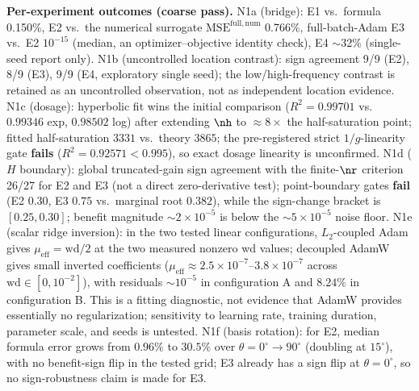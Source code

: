 \textbf{Per-experiment outcomes (coarse pass).}
N1a (bridge): E1 vs.\ formula 0.150\%, E2 vs.\ the numerical surrogate $\mathrm{MSE}^{\mathrm{full,num}}$ 0.766\%, full-batch-Adam E3 vs.\ E2 $10^{-15}$ (median, an optimizer--objective identity check), E4 $\sim$32\% (single-seed report only).
N1b (uncontrolled location contrast): sign agreement 9/9 (E2), 8/9 (E3), 9/9 (E4, exploratory single seed); the low/high-frequency contrast is retained as an uncontrolled observation, not as independent location evidence.
N1c (dosage): hyperbolic fit wins the initial comparison ($R^2=0.99701$ vs.\ $0.99346$ exp, $0.98502$ log) after extending $\nh$ to $\approx 8\times$ the half-saturation point; fitted half-saturation $3331$ vs.\ theory $3865$; the pre-registered strict $1/g$-linearity gate \textbf{fails} ($R^2=0.92571<0.995$), so exact dosage linearity is unconfirmed.
N1d ($H$ boundary): global truncated-gain sign agreement with the finite-$\nr$ criterion 26/27 for E2 and E3 (not a direct zero-derivative test); point-boundary gates \textbf{fail} (E2 $0.30$, E3 $0.75$ vs.\ marginal root $0.382$), while the sign-change bracket is $[0.25,0.30]$; benefit magnitude $\sim 2\times10^{-5}$ is below the $\sim 5\times10^{-5}$ noise floor.
N1e (scalar ridge inversion): in the two tested linear configurations, $L_2$-coupled Adam gives $\mu_{\mathrm{eff}}=\mathrm{wd}/2$ at the two measured nonzero wd values; decoupled AdamW gives small inverted coefficients ($\mu_{\mathrm{eff}}\approx2.5\times10^{-7}$--$3.8\times10^{-7}$ across $\mathrm{wd}\in[0,10^{-2}]$), with residuals $\sim10^{-5}$ in configuration A and $8.24\%$ in configuration B.
This is a fitting diagnostic, not evidence that AdamW provides essentially no regularization; sensitivity to learning rate, training duration, parameter scale, and seeds is untested.
N1f (basis rotation): for E2, median formula error grows from $0.96\%$ to $30.5\%$ over $\theta=0^\circ\to90^\circ$ (doubling at $15^\circ$), with no benefit-sign flip in the tested grid; E3 already has a sign flip at $\theta=0^\circ$, so no sign-robustness claim is made for E3.

